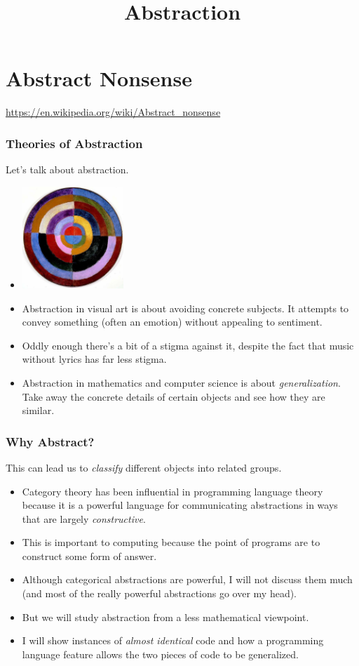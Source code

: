 \documentclass{beamer}
\title{Abstraction}
\begin{document}
\begin{frame}
\titlepage
\end{frame}
\section{Abstract Nonsense}

\begin{frame}
  \huge \centering \url{https://en.wikipedia.org/wiki/Abstract_nonsense}
\end{frame}

\begin{frame}
  \frametitle{Theories of Abstraction}
  Let's talk about abstraction.
  \begin{itemize}
  \item<2-> \includegraphics[width=0.3\textwidth]{images/abstract-art.jpg}
  \item<3-> Abstraction in visual
    art is about avoiding concrete subjects. It attempts
    to convey something (often an emotion) without appealing to sentiment.
  \item<4-> Oddly enough there's a bit of a stigma against it, despite the
    fact that music without lyrics has far less stigma.
  \item<5-> Abstraction in mathematics and computer science is about
    \emph{generalization}. Take away the concrete details of certain objects
    and see how they are similar.
  \end{itemize}
\end{frame}

\begin{frame}
  \frametitle{Why Abstract?}
  This can lead us to \emph{classify} different objects into
    related groups.
  \begin{itemize}
  \item<2-> Category theory has been influential in programming language theory
    because it is a powerful language for communicating abstractions in ways
    that are largely \emph{constructive}.
  \item<3-> This is important to computing because the point of programs
    are to construct some form of answer.
  \item<4-> Although categorical abstractions are powerful, I will not discuss them much (and most of the really powerful abstractions go over my head).
  \item<5-> But we will study abstraction from a less mathematical viewpoint.
  \item<6-> I will show instances of \emph{almost identical} code and how a programming language feature allows the two pieces of code to be generalized. 
  \end{itemize}    
\end{frame}
\end{document}
